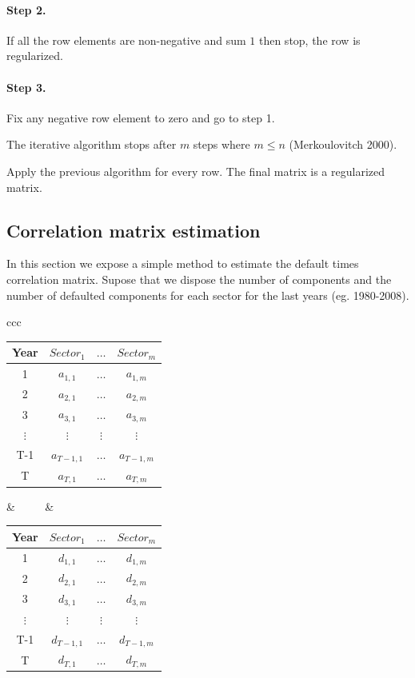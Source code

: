\documentclass[a4paper,12pt,final]{article}
\begin{document}
\paragraph{Step 2.} If all the row elements are non-negative and sum $1$ 
then stop, the row is regularized.

\paragraph{Step 3.} Fix any negative row element to zero and go to step 1.
\newline

The iterative algorithm stops after $m$ steps where $m \le n$ (Merkoulovitch 2000).
\newline

Apply the previous algorithm for every row. The final matrix is a regularized
matrix.

\subsection{Correlation matrix estimation}
\label{ap:mcorrel}

In this section we expose a simple method to estimate the default times 
correlation matrix. Supose that we dispose the number of components and the 
number of defaulted components for each sector for the last years (eg. 
1980-2008). 

\begin{center}
\begin{tabular}[]{ccc}
\begin{tabular}[]{c|ccc}
Year     & $Sector_1$   & $\dots$  & $Sector_{m}$ \\
\hline
1        & $a_{1,1}$    & $\dots$  & $a_{1,m}$    \\
2        & $a_{2,1}$    & $\dots$  & $a_{2,m}$    \\
3        & $a_{3,1}$    & $\dots$  & $a_{3,m}$    \\
$\vdots$ & $\vdots$     & $\vdots$ & $\vdots$     \\
T-1      & $a_{T-1,1}$  & $\dots$  & $a_{T-1,m}$  \\
T        & $a_{T,1}$    & $\dots$  & $a_{T,m}$    \\
\end{tabular}
& $\qquad$ &
\begin{tabular}[]{c|ccc}
Year     & $Sector_1$   & $\dots$  & $Sector_{m}$ \\
\hline
1        & $d_{1,1}$    & $\dots$  & $d_{1,m}$    \\
2        & $d_{2,1}$    & $\dots$  & $d_{2,m}$    \\
3        & $d_{3,1}$    & $\dots$  & $d_{3,m}$    \\
$\vdots$ & $\vdots$     & $\vdots$ & $\vdots$     \\
T-1      & $d_{T-1,1}$  & $\dots$  & $d_{T-1,m}$  \\
T        & $d_{T,1}$    & $\dots$  & $d_{T,m}$    \\
\end{tabular}
\end{tabular}
\end{center}
\end{document}
